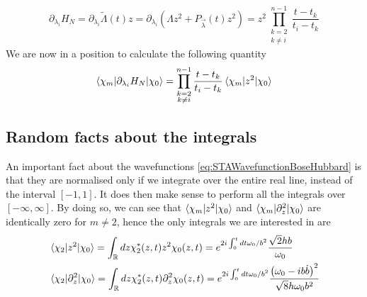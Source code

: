 \begin{equation}
\label{eq:GradientLambda}
\partial_{\lambda_{i}} H_{N}=\partial_{\lambda_{i}} \tilde{ \Lambda }(t)z = \partial_{\lambda_{i}} \left(\Lambda z^2 + P_{\vec{ \lambda }}(t)z^2    \right) =z^2\prod_{\substack{k=2\\k\neq i }}^{n-1}\frac{t-t_{k}}{t_{i} - t_{k}} 
\end{equation}
We are now in a position to calculate the following quantity
\begin{equation}
\label{eq:KnOverSpace}
\braket{\chi_{m}|\partial_{\lambda_{i}} H_{N}|\chi_{0}} = \prod_{\substack{k=2\\k\neq i }}^{n-1}\frac{t-t_{k}}{t_{i} - t_{k}} \braket{\chi_{m}|z^2 |\chi_{0}}
\end{equation}
\subsection{Random facts about the integrals}
An important fact about the wavefunctions \cref{eq:STAWavefunctionBoseHubbard} is that they are normalised only if we integrate over the entire real line, instead of the interval $ [-1,1] $.
It does then make sense to perform all the integrals over $ [-\infty, \infty] $.
By doing so, we can see that $ \braket{\chi_{m}|z^2|\chi_{0}} $ and $ \braket{\chi_{m}|\partial_z^2|\chi_{0}} $ are identically zero for $ m \neq 2 $, hence the only integrals we are interested in are
\begin{align}
	&\braket{\chi_{2}|z^2|\chi_{0}} = 
	\int_{\mathbb{R}}dz \chi_{2}^{*}(z,t) z^2 \chi_{0}(z,t) =
	e^{2i\int_{0}^{t}dt\omega_{0}/b^2 }\frac{\sqrt{2}h b   }{\omega_0}\\
	&\braket{\chi_{2}|\partial_z^2|\chi_{0}} =
	\int_{\mathbb{R}}dz \chi_{2}^{*}(z,t) \partial_z^2 \chi_{0}(z,t)= 
	e^{2i\int_{0}^{t}dt\omega_{0}/b^2 }\frac{\left(\omega_0 - ib\dot{b}\right)^2}{ \sqrt{8} h\omega_0b^2 }
\end{align}

